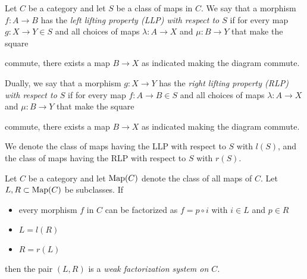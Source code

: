 \begin{definition}
    Let $C$ be a category and let $S$ be a class of maps in $C$.
    We say that a morphism $f\colon A\to B$ has the \emph{left lifting property (LLP) with respect to $S$} if for every map $g\colon X\to Y\in S$ and all choices of maps $\lambda\colon A\to X$ and $\mu\colon B\to Y$ that make the square
    \begin{center}
    \end{center}
    commute, there exists a map $B\to X$ as indicated making the diagram commute.

    Dually, we say that a morphism $g\colon X\to Y$ has the \emph{right lifting property (RLP) with respect to $S$} if for every map $f\colon A\to B\in S$ and all choices of maps $\lambda\colon A\to X$ and $\mu\colon B\to Y$ that make the square
    \begin{center}
    \end{center}
    commute, there exists a map $B\to X$ as indicated making the diagram commute.

    We denote the class of maps having the LLP with respect to $S$ with $l(S)$, and the class of maps having the RLP with respect to $S$ with $r(S)$.
\end{definition}
\begin{definition}
    Let $C$ be a category and let $\operatorname{Map}(C)$ denote the class of all maps of $C$.
    Let $L,R\subset\operatorname{Map}(C)$ be subclasses.
    If 
    \begin{itemize}
        \item every morphism $f$ in $C$ can be factorized as $f=p\circ i$ with $i\in L$ and $p\in R$
        \item $L=l(R)$
        \item $R=r(L)$
    \end{itemize}
    then the pair $(L,R)$ is a \emph{weak factorization system on $C$}.
\end{definition}
